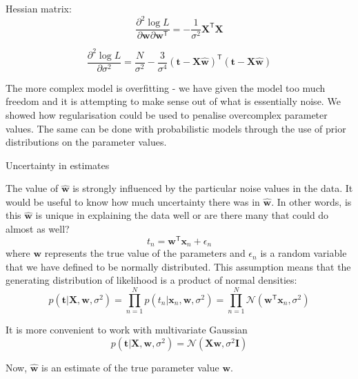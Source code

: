 \documentclass[a4paper,11pt]{article} %
\begin{document}
Hessian matrix:
\begin{equation}
\frac{\partial^2 \log L}{\partial\mathbf{w}\partial\mathbf{w}^{\mathsf{T}}} =
-\frac{1}{\sigma^2}\mathbf{X}^{\mathsf{T}}\mathbf{X}
\end{equation}

\begin{equation}
\frac{\partial^2\log L}{\partial \sigma^2} = \frac{N}{\sigma^2} -
\frac{3}{\sigma^4}(\mathbf{t} - \mathbf{X}\widehat{\mathbf{w}})^{\mathsf{T}}
(\mathbf{t} - \mathbf{X}\widehat{\mathbf{w}})
\end{equation}

The more complex model is overfitting - we have given the model too
much freedom and it is attempting to make sense out of what is essentially noise.
We showed how regularisation could be used to penalise overcomplex
parameter values. The same can be done with probabilistic models through the use
of prior distributions on the parameter values.

Uncertainty in estimates

The value of $\widehat{\mathbf{w}}$ is strongly influenced by the particular noise values in the data.
It would be useful to know how much uncertainty there was in $\widehat{\mathbf{w}}$.
In other words, is this $\widehat{\mathbf{w}}$ is unique in explaining the data well or are there
many that could do almost as well?
\begin{equation}
t_{n} = \mathbf{w}^{\mathsf{T}}\mathbf{x}_{n} + \epsilon_{n}
\end{equation}
where $\mathbf{w}$ represents the true value of the parameters and $\epsilon_n$ is a random
variable that we have defined to be normally distributed. This assumption means that the
generating distribution of likelihood is a product of normal densities:
\begin{equation}
p(\mathbf{t}|\mathbf{X},\mathbf{w},\sigma^2) =
\prod_{n=1}^{N} p(t_{n} | \mathbf{x}_{n},\mathbf{w},\sigma^2) =
\prod_{n=1}^{N} \mathcal{N}(\mathbf{w}^{\mathsf{T}}\mathbf{x}_{n},\sigma^2)
\end{equation}

It is more convenient to work with multivariate Gaussian
\begin{equation}
p(\mathbf{t}|\mathbf{X},\mathbf{w},\sigma^2) = \mathcal{N}(\mathbf{X}\mathbf{w},\sigma^2\mathbf{I})
\end{equation}

Now, $\widehat{\mathbf{w}}$ is an estimate of the true parameter value $\mathbf{w}$.
\end{document}
